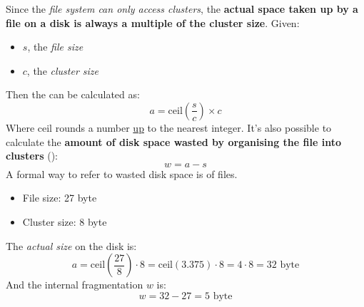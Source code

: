 \begin{itemize}
    Since the \emph{file system can only access clusters}, the \textbf{actual space taken up by a file on a disk is always a multiple of the cluster size}. Given:
    \begin{itemize}
        \item $s$, the \emph{file size}
        \item $c$, the \emph{cluster size}
    \end{itemize}
    Then the  can be calculated as:
    \begin{equation}
        a = \mathrm{ceil}\left(\dfrac{s}{c}\right) \times c
    \end{equation}
    Where $\mathrm{ceil}$ rounds a number \underline{up} to the nearest integer. It's also possible to calculate the \textbf{amount of disk space wasted by organising the file into clusters} ():
    \begin{equation}
        w = a - s
    \end{equation}
    A formal way to refer to wasted disk space is  of files.
    \newpage
    \begin{examplebox}
        \begin{itemize}
            \item File size: 27 byte
            \item Cluster size: 8 byte
        \end{itemize}
        The \emph{actual size} on the disk is:
        \begin{equation*}
            a = \mathrm{ceil}\left(\dfrac{27}{8}\right) \cdot 8 = \mathrm{ceil}\left(3.375\right) \cdot 8 = 4 \cdot 8 = 32 \text{ byte}
        \end{equation*}
        And the internal fragmentation $w$ is:
        \begin{equation*}
            w = 32 - 27 = 5 \text{ byte}
        \end{equation*}
    \end{examplebox}


\end{itemize}
